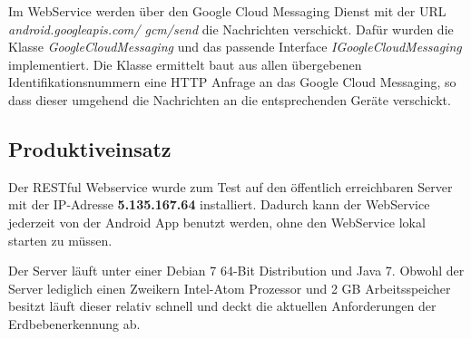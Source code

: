 Im WebService werden über den Google Cloud Messaging Dienst mit der URL \textit{android.googleapis.com/ gcm/send} die Nachrichten verschickt. Dafür wurden die Klasse \textit{GoogleCloudMessaging} und das passende Interface \textit{IGoogleCloudMessaging} implementiert. Die Klasse ermittelt baut aus allen übergebenen Identifikationsnummern eine HTTP Anfrage an das Google Cloud Messaging, so dass dieser umgehend die Nachrichten an die entsprechenden Geräte verschickt.

\subsection{Produktiveinsatz}
Der RESTful Webservice wurde zum Test auf den öffentlich erreichbaren Server mit der IP-Adresse \textbf{5.135.167.64} installiert. Dadurch kann der WebService jederzeit von der Android App benutzt werden, ohne den WebService lokal starten zu müssen. 

Der Server läuft unter einer Debian 7 64-Bit Distribution und Java 7. Obwohl der Server lediglich einen Zweikern Intel-Atom Prozessor und 2 GB Arbeitsspeicher besitzt läuft dieser relativ schnell und deckt die aktuellen Anforderungen der Erdbebenerkennung ab.